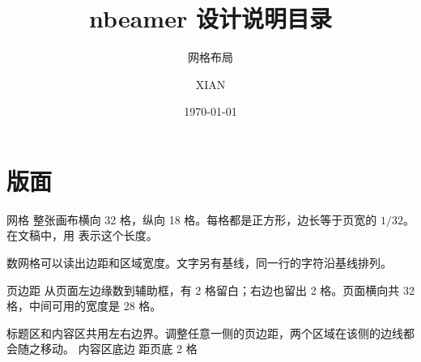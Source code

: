 \documentclass{nbeamer}
\title{nbeamer 设计说明}
\subtitle{网格布局}
\author{XIAN}
\institute{纳米树研究室 Namishu Research Lab}
\date{\today}
\begin{document}
\begin{frame}
  \titlepage
\end{frame}

\begin{frame}
  \title{目录}
\end{frame}

\section{版面}
\begin{frame}[fragile]{网格}
  整张画布横向 32 格，纵向 18 格。每格都是正方形，边长等于页宽的 $1/32$。在文稿中，用 \incode{\nbgrid} 表示这个长度。

  {\centering
    \par}

  数网格可以读出边距和区域宽度。文字另有基线，同一行的字符沿基线排列。
\end{frame}

\begin{frame}{页边距}
  从页面左边缘数到辅助框，有 2 格留白；右边也留出 2 格。页面横向共 32 格，中间可用的宽度是 28 格。

  标题区和内容区共用左右边界。调整任意一侧的页边距，两个区域在该侧的边线都会随之移动。
  \vfill
  内容区底边 \hfill 距页底 2 格
\end{frame}
\end{document}
